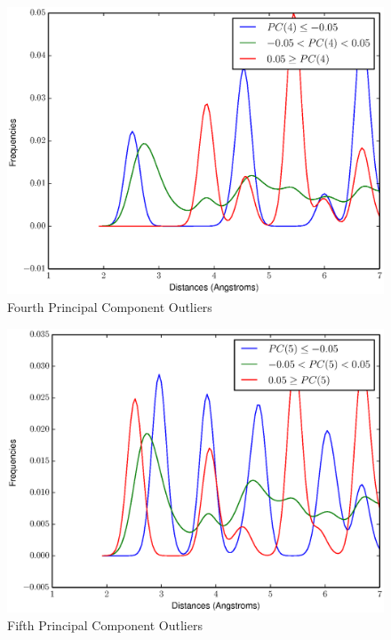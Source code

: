 \documentclass[12pt,letterpaper]{article}
\begin{document}
\begin{figure}[ht]
  \begin{center}
    \includegraphics[scale=0.8]{figs/eigenOutlier4.eps}
    \caption{Fourth Principal Component Outliers}
  \end{center}
\end{figure}

\begin{figure}[ht]
  \begin{center}
    \includegraphics[scale=0.8]{figs/eigenOutlier5.eps}
    \caption{Fifth Principal Component Outliers}
  \end{center}
\end{figure}
\clearpage
\end{document}
